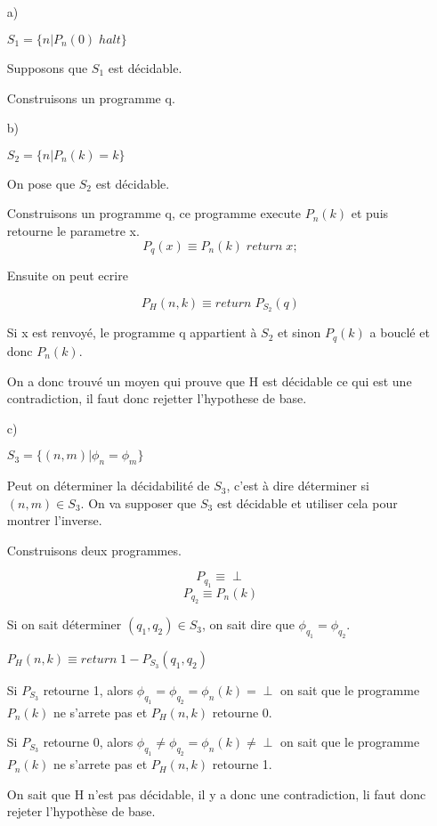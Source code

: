 
\subsection{}
\begin{itemize}
\item[a)]

$S_1 = \{n | P_n(0) \; halt\}$

Supposons que $S_1$ est décidable.

Construisons un programme q.

\item[b)]

$S_2 = \{n | P_n(k) = k\}$

On pose que $S_2$ est décidable.

Construisons un programme q, ce programme execute $P_n(k)$ et puis retourne le parametre x.
$$P_q(x) \equiv P_n(k) \; return \; x;$$

Ensuite on peut ecrire

$$P_H(n,k) \equiv return \; P_{S_2}(q)$$

Si x est renvoyé, le programme q appartient à $S_2$ et sinon $P_q(k)$ a bouclé et donc $P_n(k)$.

On a donc trouvé un moyen qui prouve que H est décidable ce qui est une contradiction, il faut donc rejetter l'hypothese de base.

\item[c)]

$S_3 = \{(n,m) | \phi_n = \phi_m\}$

Peut on déterminer la décidabilité de $S_3$, c'est à dire déterminer si $(n,m) \in S_3$. On va supposer que $S_3$ est décidable et utiliser cela pour montrer l'inverse.

Construisons deux programmes.

$$P_{q_1} \equiv \perp$$
$$P_{q_2} \equiv P_n(k)$$

Si on sait déterminer $(q_1, q_2) \in S_3$, on sait dire que $\phi_{q_1} = \phi_{q_2}$.

$P_H(n,k) \equiv return \; 1 - P_{S_3}(q_1, q_2)$

Si $P_{S_3}$ retourne 1, alors $\phi_{q_1} = \phi_{q_2} = \phi_n(k) = \perp$ on sait que le programme $P_n(k)$ ne s'arrete pas et $P_H(n,k)$ retourne 0.

Si $P_{S_3}$ retourne 0, alors $\phi_{q_1} \neq \phi_{q_2} = \phi_n(k) \neq \perp$ on sait que le programme $P_n(k)$ ne s'arrete pas et $P_H(n,k)$ retourne 1.

On sait que H n'est pas décidable, il y a donc une contradiction, li faut donc rejeter l'hypothèse de base.


\end{itemize}
